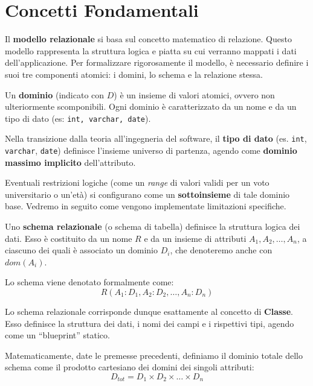 \section{Concetti Fondamentali}

Il \textbf{modello relazionale} si basa sul concetto matematico di relazione. Questo modello rappresenta la struttura logica e piatta su cui verranno mappati i dati dell'applicazione. Per formalizzare rigorosamente il modello, è necessario definire i suoi tre componenti atomici: i domini, lo schema e la relazione stessa.

\medskip

Un \textbf{dominio} (indicato con $D$) è un insieme di valori atomici, ovvero non ulteriormente scomponibili. 
Ogni dominio è caratterizzato da un nome e da un tipo di dato (es: \texttt{int, varchar, date}).
\begin{observation}
Nella transizione dalla teoria all'ingegneria del software, il \textbf{tipo di dato} (es. \texttt{int}, \texttt{varchar}, \texttt{date}) definisce l'insieme universo di partenza, agendo come \textbf{dominio massimo implicito} dell'attributo. 

Eventuali restrizioni logiche (come un \textit{range} di valori validi per un voto universitario o un'età) si configurano come un \textbf{sottoinsieme} di tale dominio base. Vedremo in seguito come vengono implementate limitazioni specifiche. 
\end{observation}

\medskip

Uno \textbf{schema relazionale} (o schema di tabella) definisce la struttura logica dei dati. Esso è costituito da un nome $R$ e da un insieme di attributi $A_1, A_2, \dots, A_n$, a ciascuno dei quali è associato un dominio $D_i$, che denoteremo anche con $dom(A_i)$.

Lo schema viene denotato formalmente come:
$$R(A_1: D_1, A_2: D_2, \dots, A_n: D_n)$$

Lo schema relazionale corrisponde dunque esattamente al concetto di \textbf{Classe}. Esso definisce la struttura dei dati, i nomi dei campi e i rispettivi tipi, agendo come un ``blueprint'' statico.

Matematicamente, date le premesse precedenti, definiamo il dominio totale dello schema come il prodotto cartesiano dei domini dei singoli attributi:
$$D_{tot} = D_1 \times D_2 \times \dots \times D_n$$

\medskip


